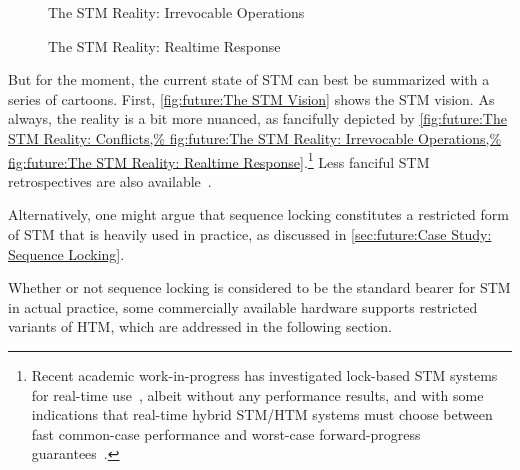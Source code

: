 \begin{figure}
\centering
{}
\caption{The STM Reality:
			  Irrevocable Operations}
\end{figure}

\begin{figure}
\centering
{}
\caption{The STM Reality:
			  Realtime Response}
\end{figure}

But for the moment, the current state of STM
can best be summarized with a series of cartoons.
First,
\cref{fig:future:The STM Vision}
shows the STM vision.
As always, the reality is a bit more nuanced, as fancifully depicted by
\cref{fig:future:The STM Reality: Conflicts,%
fig:future:The STM Reality: Irrevocable Operations,%
fig:future:The STM Reality: Realtime Response}.\footnote{
	Recent academic work-in-progress has investigated lock-based STM
	systems for real-time use~\cite{JimAnderson2019STMRT,CatherineNemitz2018LockSTMrealtime},
	albeit without any performance results, and with some indications
	that real-time hybrid STM/HTM systems must choose between fast
	common-case performance and worst-case forward-progress
	guarantees~\cite{DBLP:journals/corr/AlistarhKKRS14,MartinSchoeberl2010realtimeTM}.}
Less fanciful STM retrospectives are also
available~\cite{JoeDuffy2010RetroTM,JoeDuffy2010RetroTM2}.

Alternatively, one might argue that sequence locking constitutes a
restricted form of STM that is heavily used in practice, as discussed in
\cref{sec:future:Case Study: Sequence Locking}.

Whether or not sequence locking is considered to be the standard bearer
for STM in actual practice, some commercially available hardware supports
restricted variants of HTM, which are addressed in the following section.
